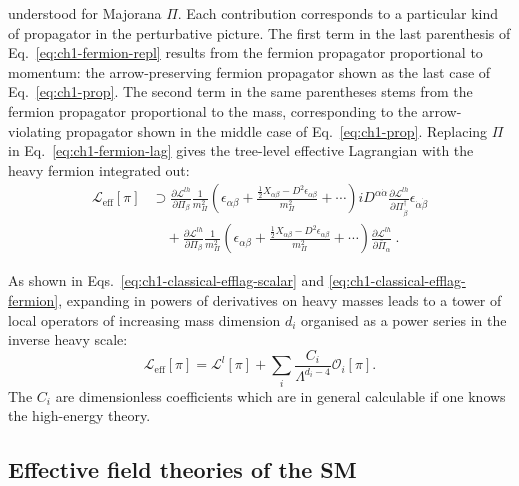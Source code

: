 understood for Majorana $\Pi$. Each contribution corresponds to a particular
kind of propagator in the perturbative picture. The first term in the last
parenthesis of Eq.~\eqref{eq:ch1-fermion-repl} results from the fermion propagator
proportional to momentum: the arrow-preserving fermion propagator shown as the
last case of Eq.~\eqref{eq:ch1-prop}. The second term in the same parentheses stems
from the fermion propagator proportional to the mass, corresponding to the
arrow-violating propagator shown in the middle case of Eq.~\eqref{eq:ch1-prop}.
Replacing $\Pi$ in Eq.~\eqref{eq:ch1-fermion-lag} gives the tree-level effective
Lagrangian with the heavy fermion integrated out:
\begin{equation}
  \begin{aligned}
  \label{eq:ch1-classical-efflag-fermion}
  \mathscr{L}_{\text{eff}}[\pi] &\supset \frac{\partial \mathscr{L}^{lh}}{\partial \Pi_{\beta}} \frac{1}{m_{\Pi}^{2}} \left(\epsilon_{\alpha \beta} + \frac{ \tfrac{1}{2} X_{\alpha \beta} - D^{2} \epsilon_{\alpha \beta}}{m_{\Pi}^{2}} +  \cdots \right) i D^{\alpha \dot{\alpha}} \frac{\partial \mathscr{L}^{lh}}{\partial \Pi^{\dagger}_{\dot{\beta}}} \epsilon_{\dot{\alpha} \dot{\beta}}\\
  &\quad + \frac{\partial \mathscr{L}^{lh}}{\partial \Pi_{\beta}} \frac{1}{m_{\Pi}^{2}} \left(\epsilon_{\alpha \beta} + \frac{ \tfrac{1}{2} X_{\alpha \beta} - D^{2} \epsilon_{\alpha \beta}}{m_{\Pi}^{2}} + \cdots \right) \frac{\partial \mathscr{L}^{lh}}{\partial \bar{\Pi}_{\alpha}} \ .
  \end{aligned}
\end{equation}

As shown in Eqs.~\eqref{eq:ch1-classical-efflag-scalar} and
\eqref{eq:ch1-classical-efflag-fermion}, expanding in powers of derivatives on heavy
masses leads to a tower of local operators of increasing mass dimension $d_{i}$
organised as a power series in the inverse heavy scale:
\begin{equation}
  \mathscr{L}_{\text{eff}}[\pi] = \mathscr{L}^{l}[\pi] + \sum_{i} \frac{C_{i}}{\Lambda^{d_{i}-4}} \mathcal{O}_{i}[\pi].
\end{equation}
The $C_{i}$ are dimensionless coefficients which are in general calculable if
one knows the high-energy theory.

\subsection{Effective field theories of the SM}
\label{sec:ch1-EFT-of-SM}

